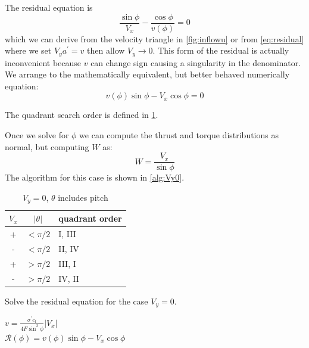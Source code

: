 \documentclass{article}
\begin{document}
The residual equation is
\begin{equation}
    \frac{\sin\phi}{V_x} - \frac{\cos\phi}{v(\phi)} = 0
\end{equation}
which we can derive from the velocity triangle in \cref{fig:inflowu} or from \cref{eq:residual} where we set $V_y a^\prime = v$ then allow $V_y \rightarrow 0$.  This form of the residual is actually inconvenient because $v$ can change sign causing a singularity in the denominator.  We arrange to the mathematically equivalent, but better behaved numerically equation:
\begin{equation}
    v(\phi)\sin\phi - V_x \cos\phi = 0
\end{equation}

The quadrant search order is defined in \cref{tab:bracket3}.

Once we solve for $\phi$ we can compute the thrust and torque distributions as normal, but computing $W$ as:
\begin{equation}
    W = \frac{V_x}{\sin\phi}
\end{equation}
The algorithm for this case is shown in \cref{alg:Vy0}.

\begin{table}[htb]
\centering
\caption{$V_y = 0$, $\theta$ includes pitch}
\label{tab:bracket3}
\begin{tabular}{@{}ccl@{}}
\toprule
$V_x$ & $|\theta|$ & quadrant order \\
\midrule
+ & $< \pi/2$ & I, III \\
- & $< \pi/2$ & II, IV \\
+ & $> \pi/2$ & III, I \\
- & $> \pi/2$ & IV, II \\
\bottomrule
\end{tabular}
\end{table}

\begin{algorithm}[htbp]
\caption{Solve the residual equation for the case $V_y = 0$.}
\begin{algorithmic}
\State $v = \frac{\sigma^\prime c_t}{4 F \sin^2\phi} |V_x|$
\\
\State $\mathcal{R}(\phi) = v(\phi)\sin\phi - V_x \cos\phi$

\end{algorithmic}
\label{alg:Vy0}
\end{algorithm}
\end{document}

